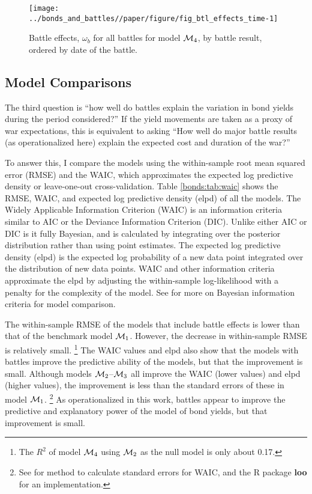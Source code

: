 \begin{figure}[!htpb]
  \centering
  \texttt{[image: ../bonds\_and\_battles//paper/figure/fig\_btl\_effects\_time-1]}  
  \caption[Battle effects for model $\Model{3}$, ordered by time]{
    Battle effects, $\omega_{b}$ for all battles for model $\mathcal{M}_{\text{4}}$, by battle result, ordered by date of the battle.
  }
  \label{bonds:fig:btl_effects_time}
\end{figure}



\subsection{Model Comparisons}
\label{sec:over-effects-battl}

The third question is ``how well do battles explain the variation in bond yields during the period considered?''
If the yield movements are taken as a proxy of war expectations, this is equivalent to asking ``How well do major battle results (as operationalized here) explain the expected cost and duration of the war?''

To answer this, I compare the models using the within-sample root mean squared error (RMSE) and the WAIC, which approximates the expected log predictive density or leave-one-out cross-validation.
Table \ref{bonds:tab:waic} shows the RMSE, WAIC, and expected log predictive density (elpd) of all the models.
The Widely Applicable Information Criterion (WAIC) \parencite{Watanabe2010} is an information criteria similar to AIC or the Deviance Information Criterion (DIC).
Unlike either AIC or DIC is it fully Bayesian, and is calculated by integrating over the posterior distribution rather than using point estimates.
The expected log predictive density (elpd) is the expected log probability of a new data point integrated over the distribution of new data points.
WAIC and other information criteria approximate the elpd by adjusting the within-sample log-likelihood with a penalty for the complexity of the model.
See \textcites[Ch. 7]{GelmanCarlinSternEtAl2013a}{GelmanHwangVehtari2014a}{GelmanVehtari2014a} for more on Bayesian information criteria for model comparison.

The within-sample RMSE of the models that include battle effects is lower than that of the benchmark model $\mathcal{M}_{\text{1}}$. 
However, the decrease in within-sample RMSE is relatively small.%
\footnote{The $R^{2}$ of model $\mathcal{M}_{\text{4}}$ using $\mathcal{M}_{\text{2}}$ as the null model is only about 0.17.}
The WAIC values and elpd also show that the models with battles improve the predictive ability of the models, but that the improvement is small.
Although models $\mathcal{M}_{\text{2}}$--$\Model{3}$ all improve the WAIC (lower values) and elpd (higher values), the improvement is less than the standard errors of these  in model $\mathcal{M}_{\text{1}}$.%
\footnote{See \textcite{GelmanVehtari2014a} for method to calculate standard errors for WAIC, and the R package \textbf{loo} for an implementation.}
As operationalized in this work, battles appear to improve the predictive and explanatory power of the model of bond yields, but that improvement is small.

